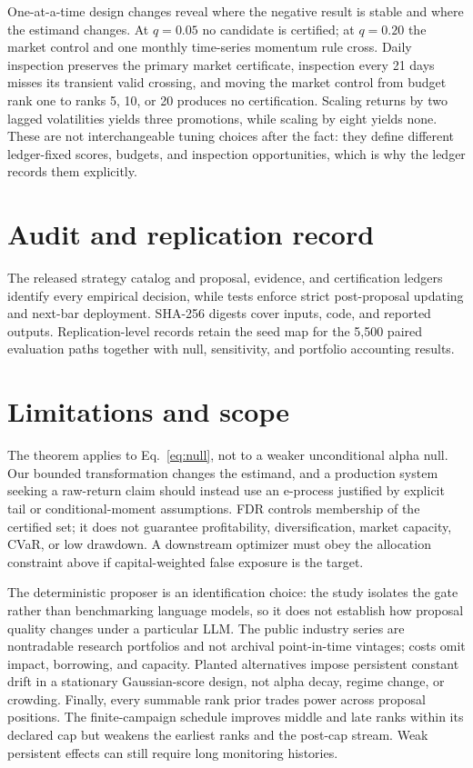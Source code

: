 One-at-a-time design changes reveal where the negative result is stable and
where the estimand changes.  At \(q=0.05\) no candidate is certified; at
\(q=0.20\) the market control and one monthly time-series momentum rule cross.
Daily inspection preserves the primary market certificate, inspection every
21 days misses its transient valid crossing, and moving the market control
from budget rank one to ranks 5, 10, or 20 produces no certification.  Scaling
returns by two lagged volatilities yields three promotions, while scaling by
eight yields none.  These are not interchangeable tuning choices after the
fact: they define different ledger-fixed scores, budgets, and inspection
opportunities, which is why the ledger records them explicitly.

\section{Audit and replication record}
\label{sec:reproducibility}

The released strategy catalog and proposal, evidence, and certification
ledgers identify every empirical decision, while tests enforce strict
post-proposal updating and next-bar deployment.  SHA-256 digests cover inputs,
code, and reported outputs.  Replication-level records retain the seed map for
the 5,500 paired evaluation paths together with null, sensitivity, and
portfolio accounting results.

\FloatBarrier
\section{Limitations and scope}
\label{sec:limitations}

The theorem applies to Eq.~\eqref{eq:null}, not to a weaker unconditional
alpha null.  Our bounded transformation changes the estimand, and a production
system seeking a raw-return claim should instead use an e-process justified
by explicit tail or conditional-moment assumptions.  FDR controls membership
of the certified set; it does not guarantee profitability, diversification,
market capacity, CVaR, or low drawdown.  A downstream optimizer must obey the
allocation constraint above if capital-weighted false exposure is the target.

The deterministic proposer is an identification choice: the study isolates
the gate rather than benchmarking language models, so it does not establish
how proposal quality changes under a particular LLM.  The public industry
series are nontradable research
portfolios and not archival point-in-time vintages; costs omit impact,
borrowing, and capacity.  Planted alternatives impose persistent constant
drift in a stationary Gaussian-score design, not alpha decay, regime change,
or crowding.  Finally, every summable rank prior trades power across proposal
positions.  The finite-campaign schedule improves middle and late ranks
within its declared cap but weakens the earliest ranks and the post-cap stream.
Weak persistent effects can still require long monitoring histories.

